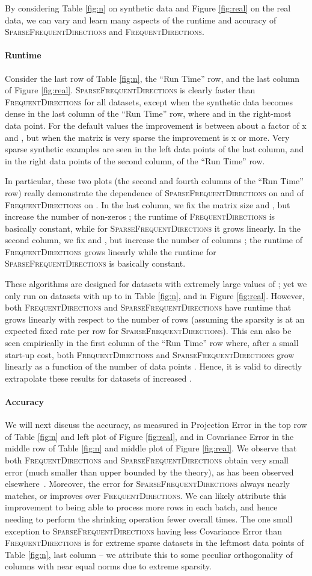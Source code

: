 \documentclass[11pt]{article}
\newcommand{\fd}{\textsc{FrequentDirections}\xspace}
\newcommand{\sfd}{\textsc{SparseFrequentDirections}\xspace}
\newcommand{\Paragraph}[1]{\paragraph*{\sffamily \textbf{#1}}}
\begin{document}
By considering Table \ref{fig:n} on synthetic data and Figure \ref{fig:real} on the real data, we can vary and learn many aspects of the runtime and accuracy of \sfd and \fd.  

\Paragraph{Runtime}
Consider the last row of Table \ref{fig:n}, the ``Run Time'' row, and the last column of Figure \ref{fig:real}.  
\sfd is clearly faster than \fd for all datasets, except when the synthetic data becomes dense in the last column of the ``Run Time'' row, where  and  in the right-most data point.  For the default values the improvement is between about a factor of x and , but when the matrix is very sparse the improvement is x or more.  Very sparse synthetic examples are seen in the left data points of the last column, and in the right data points of the second column, of the ``Run Time'' row. 

In particular, these two plots (the second and fourth columns of the ``Run Time'' row) really demonstrate the dependence of \sfd on  and of \fd on .  
In the last column, we fix the matrix size  and , but increase the number of non-zeros ; the runtime of \fd is basically constant, while for \sfd it grows linearly.  
In the second column, we fix  and , but increase the number of columns ; the runtime of \fd grows linearly while the runtime for \sfd is basically constant.  

These algorithms are designed for datasets with extremely large values of ; yet we only run on datasets with  up to  in Table \ref{fig:n}, and  in Figure \ref{fig:real}.  However, both \fd and \sfd have runtime that grows linearly with respect to the number of rows (assuming the sparsity is at an expected fixed rate per row for \sfd).  This can also be seen empirically in the first column of the ``Run Time'' row where, after a small start-up cost, both \fd and \sfd grow linearly as a function of the number of data points .  Hence, it is valid to directly extrapolate these results for datasets of increased .  

\Paragraph{Accuracy}
We will next discuss the accuracy, as measured in Projection Error in the top row of Table \ref{fig:n} and left plot of Figure \ref{fig:real}, and in Covariance Error in the middle row of Table \ref{fig:n} and middle plot of Figure \ref{fig:real}.  
We observe that both \fd and \sfd obtain very small error (much smaller than upper bounded by the theory), as has been observed elsewhere~\cite{ghashami2015frequent,desai2015improved}.  Moreover, the error for \sfd always nearly matches, or improves over \fd.  We can likely attribute this improvement to being able to process more rows in each batch, and hence needing to perform the shrinking operation fewer overall times.  
The one small exception to \sfd having less Covariance Error than \fd is for extreme sparse datasets in the leftmost data points of Table \ref{fig:n}, last column -- we attribute this to some peculiar orthogonality of columns with near equal norms due to extreme sparsity.  








\end{document}
